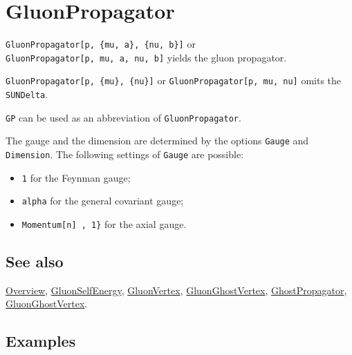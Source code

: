 \documentclass[../FeynCalcManual.tex]{subfiles}
\begin{document}
\hypertarget{gluonpropagator}{
\section{GluonPropagator}\label{gluonpropagator}}

\texttt{GluonPropagator[\allowbreak{}p,\ \allowbreak{}\{\allowbreak{}mu,\ \allowbreak{}a\},\ \allowbreak{}\{\allowbreak{}nu,\ \allowbreak{}b\}]}
or
\texttt{GluonPropagator[\allowbreak{}p,\ \allowbreak{}mu,\ \allowbreak{}a,\ \allowbreak{}nu,\ \allowbreak{}b]}
yields the gluon propagator.

\texttt{GluonPropagator[\allowbreak{}p,\ \allowbreak{}\{\allowbreak{}mu\},\ \allowbreak{}\{\allowbreak{}nu\}]}
or
\texttt{GluonPropagator[\allowbreak{}p,\ \allowbreak{}mu,\ \allowbreak{}nu]}
omits the \texttt{SUNDelta}.

\texttt{GP} can be used as an abbreviation of \texttt{GluonPropagator}.

The gauge and the dimension are determined by the options \texttt{Gauge}
and \texttt{Dimension}. The following settings of \texttt{Gauge} are
possible:

\begin{itemize}
\tightlist
\item
  \texttt{1} for the Feynman gauge;\\
\item
  \texttt{alpha} for the general covariant gauge;
\item
  \texttt{Momentum[\allowbreak{}n] ,\ \allowbreak{}1\}} for the axial
  gauge.
\end{itemize}

\subsection{See also}

\hyperlink{toc}{Overview}, \hyperlink{gluonselfenergy}{GluonSelfEnergy},
\hyperlink{gluonvertex}{GluonVertex},
\hyperlink{gluonghostvertex}{GluonGhostVertex},
\hyperlink{ghostpropagator}{GhostPropagator},
\hyperlink{gluonghostvertex}{GluonGhostVertex}.

\subsection{Examples}

\begin{Shaded}
\begin{Highlighting}[]
\OperatorTok{[}\OperatorTok{,} \SpecialCharTok{\textbackslash{}}\OperatorTok{[}\OperatorTok{],} \OperatorTok{,} \SpecialCharTok{\textbackslash{}}\OperatorTok{[}\OperatorTok{],} \OperatorTok{]} 
 
\OperatorTok{[}\SpecialCharTok{\%}\OperatorTok{]}
\end{Highlighting}
\end{Shaded}
\end{document}
